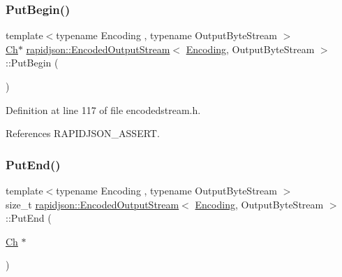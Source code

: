 \subsubsection{\texorpdfstring{PutBegin()}{PutBegin()}}
{\footnotesize\ttfamily template$<$typename Encoding , typename Output\+Byte\+Stream $>$ \\
\mbox{\hyperlink{classrapidjson_1_1_encoded_output_stream_aa96ac761f570fbdbcc2375ad4edd8b6f}{Ch}}$\ast$ \mbox{\hyperlink{classrapidjson_1_1_encoded_output_stream}{rapidjson\+::\+Encoded\+Output\+Stream}}$<$ \mbox{\hyperlink{classrapidjson_1_1_encoding}{Encoding}}, Output\+Byte\+Stream $>$\+::Put\+Begin (\begin{DoxyParamCaption}{ }\end{DoxyParamCaption})}



Definition at line 117 of file encodedstream.\+h.


\begin{DoxyCode}{0}

\end{DoxyCode}


References R\+A\+P\+I\+D\+J\+S\+O\+N\+\_\+\+A\+S\+S\+E\+RT.

\mbox{\label{classrapidjson_1_1_encoded_output_stream_a6739a8fb953962998438c636ff9f05a3}} 
\subsubsection{\texorpdfstring{PutEnd()}{PutEnd()}}
{\footnotesize\ttfamily template$<$typename Encoding , typename Output\+Byte\+Stream $>$ \\
size\+\_\+t \mbox{\hyperlink{classrapidjson_1_1_encoded_output_stream}{rapidjson\+::\+Encoded\+Output\+Stream}}$<$ \mbox{\hyperlink{classrapidjson_1_1_encoding}{Encoding}}, Output\+Byte\+Stream $>$\+::Put\+End (\begin{DoxyParamCaption}\item[{\mbox{\hyperlink{classrapidjson_1_1_encoded_output_stream_aa96ac761f570fbdbcc2375ad4edd8b6f}{Ch}} $\ast$}]{ }\end{DoxyParamCaption})}



